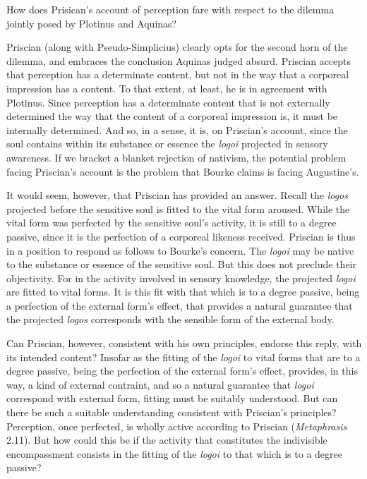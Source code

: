 \documentclass[12pt]{article}
\begin{document}
How does Prisican's account of perception fare with respect to the dilemma jointly posed by Plotinus and Aquinas?

Priscian (along with Pseudo-Simplicius) clearly opts for the second horn of the dilemma, and embraces the conclusion Aquinas judged absurd. Priscian accepts that perception has a determinate content, but not in the way that a corporeal impression has a content. To that extent, at least, he is in agreement with Plotinus. Since perception has a determinate content that is not externally determined the way that the content of a corporeal impression is, it must be internally determined. And so, in a sense, it is, on Priscian's account, since the soul contains within its substance or essence the \emph{logoi} projected in sensory awareness. If we bracket a blanket rejection of nativism, the potential problem facing Priscian's account is the problem that Bourke claims is facing Augustine's.

It would seem, however, that Priscian has provided an answer. Recall the \emph{logos} projected before the sensitive soul is fitted to the vital form aroused. While the vital form was perfected by the sensitive soul's activity, it is still to a degree passive, since it is the perfection of a corporeal likeness received. Priscian is thus in a position to respond as follows to Bourke's concern. The \emph{logoi} may be native to the substance or essence of the sensitive soul. But this does not preclude their objectivity. For in the activity involved in sensory knowledge, the projected \emph{logoi} are fitted to vital forms. It is this fit with that which is to a degree passive, being a perfection of the external form's effect, that provides a natural guarantee that the projected \emph{logos} corresponds with the sensible form of the external body.

Can Priscian, however, consistent with his own principles, endorse this reply, with its intended content? Insofar as the fitting of the \emph{logoi} to vital forms that are to a degree passive, being the perfection of the external form's effect, provides, in this way, a kind of external contraint, and so a natural guarantee that \emph{logoi} correspond with external form, fitting must be suitably understood. But can there be such a suitable understanding consistent with Priscian's principles? Perception, once perfected, is wholly active according to Priscian (\emph{Metaphrasis} 2.11). But how could this be if the activity that constitutes the indivisible encompassment consists in the fitting of the \emph{logoi} to that which is to a degree passive?
\end{document}
